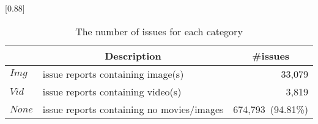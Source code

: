 
\begin{table}[t]
    \begin{center}
    \caption{The number of issues for each category}
    \scalebox{0.88}[0.88]{
    \begin{tabular}{llr}
        \toprule
         & \multicolumn{1}{c}{\textbf{Description}} & \multicolumn{1}{c}{\textbf{\#issues}} \\
        \midrule
        $Img$  & issue reports containing image(s) & 33,079\hspace{2.5mm}{\small (4.65\%)}\\%
        $Vid$  & issue reports containing video(s) & 3,819\hspace{2.5mm}{\small (0.54\%)}\\%
        $None$ & issue reports containing no movies/images & 674,793~{\small (94.81\%)}\\ 
        \bottomrule
    \end{tabular}
    }
    \label{tab:issue-category}
    \end{center}
    
\end{table}
